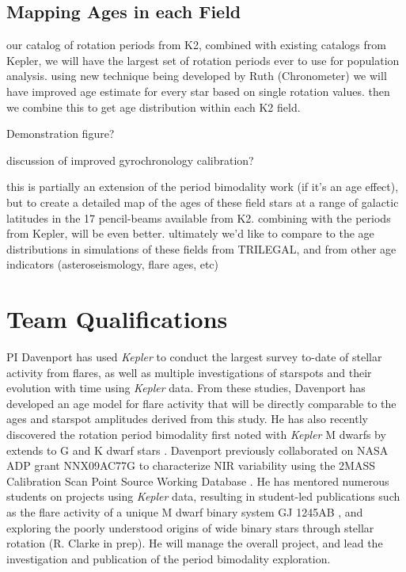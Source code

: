 \documentclass[12pt]{article}
\newcommand{\Kepler}{\textsl{Kepler}\xspace}
\begin{document}
\subsection{Mapping Ages in each Field}
our catalog of rotation periods from K2, combined with existing catalogs from Kepler, we will have the largest set of rotation periods ever to use for population analysis. using new technique being developed by Ruth (Chronometer) we will have improved age estimate for every star based on single rotation values. then we combine this to get age distribution within each K2 field.

Demonstration figure?

discussion of improved gyrochronology calibration?

this is partially an extension of the period bimodality work (if it's an age effect), but to create a detailed map of the ages of these field stars at a range of galactic latitudes in the 17 pencil-beams available from K2. combining with the periods from Kepler, will be even better. ultimately we'd like to compare to the age distributions in simulations of these fields from TRILEGAL, and from other age indicators (asteroseismology, flare ages, etc)



\section{Team Qualifications}
PI Davenport has used \Kepler to conduct the largest survey to-date of stellar activity from flares, as well as multiple investigations of starspots and their evolution with time using \Kepler data. From these studies, Davenport has developed an age model for flare activity that will be directly comparable to the ages and starspot amplitudes derived from this study. He has also recently discovered the rotation period bimodality first noted with \Kepler M dwarfs by \citet{mcquillan2013} extends to G and K dwarf stars \citep{davenport2017}.
Davenport previously collaborated on NASA ADP grant NNX09AC77G to characterize NIR variability using the 2MASS Calibration Scan Point Source Working Database \citep{davenport2012,davenport2015a}.
He has mentored numerous students on projects using \Kepler data, resulting in student-led publications such as the flare activity of a unique M dwarf binary system GJ 1245AB \citep{lurie2015}, and exploring the poorly understood origins of wide binary stars through stellar rotation (R. Clarke in prep). He will manage the overall project, and lead the investigation and publication of the period bimodality exploration.
\end{document}

